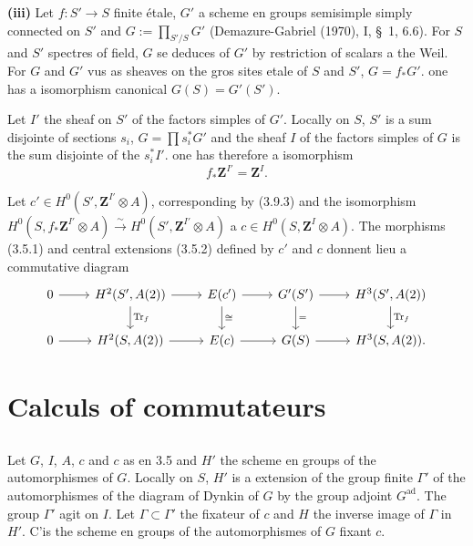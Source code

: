 \documentclass[11pt,a4paper]{article}
\theoremstyle{plain}
\theoremstyle{definition}
\DeclareMathOperator{\ad}{ad}
\DeclareMathOperator{\Tr}{Tr}
\begin{document}
\textbf{(iii)} Let $f : S' \to S$ finite étale, $G'$ a scheme en groups semisimple simply connected on $S'$ and $G := \prod_{S'/S} G'$ (Demazure-Gabriel (1970), I, \S~1, 6.6). For $S$ and $S'$ spectres of field, $G$ se deduces of $G'$ by restriction of scalars a the Weil. For $G$ and $G'$ vus as sheaves on the gros sites etale of $S$ and $S'$, $G = f_* G'$. one has a isomorphism canonical $G(S) = G'(S')$.

Let $I'$ the sheaf on $S'$ of the factors simples of $G'$. Locally on $S$, $S'$ is a sum disjointe of sections $s_i$, $G = \prod s_i^* G'$ and the sheaf $I$ of the factors simples of $G$ is the sum disjointe of the $s_i^* I'$. one has therefore a isomorphism
\begin{equation}\label{3.9.3}
f_* \mathbf{Z}^{I'} = \mathbf{Z}^I.
\end{equation}

Let $c' \in H^0(S', \mathbf{Z}^{I'} \otimes A)$, corresponding by (3.9.3) and the isomorphism $H^0(S, f_* \mathbf{Z}^{I'} \otimes A) \xrightarrow{\sim} H^0(S', \mathbf{Z}^{I'} \otimes A)$ a $c \in H^0(S, \mathbf{Z}^I \otimes A)$. The morphisms (3.5.1) and central extensions (3.5.2) defined by $c'$ and $c$ donnent lieu a commutative diagram
\begin{equation}\label{3.9.4}
\begin{tikzcd}
0 \arrow{r} & H^2(S', A(2)) \arrow{r} \arrow{d}{\Tr_f} & E(c') \arrow{r} \arrow{d}{\cong} & G'(S') \arrow{r} \arrow{d}{=} & H^3(S', A(2)) \arrow{d}{\Tr_f} \\
0 \arrow{r} & H^2(S, A(2)) \arrow{r} & E(c) \arrow{r} & G(S) \arrow{r} & H^3(S, A(2)).
\end{tikzcd}
\end{equation}

\section{Calculs of commutateurs}

\subsection{}\label{4.1}

Let $G$, $I$, $A$, $c$ and $c$ as en 3.5 and $H'$ the scheme en groups of the automorphismes of $G$. Locally on $S$, $H'$ is a extension of the group finite $\Gamma'$ of the automorphismes of the diagram of Dynkin of $G$ by the group adjoint $G^{\ad}$. The group $\Gamma'$ agit on $I$. Let $\Gamma \subset \Gamma'$ the fixateur of $c$ and $H$ the inverse image of $\Gamma$ in $H'$. C'is the scheme en groups of the automorphismes of $G$ fixant $c$.
\end{document}
